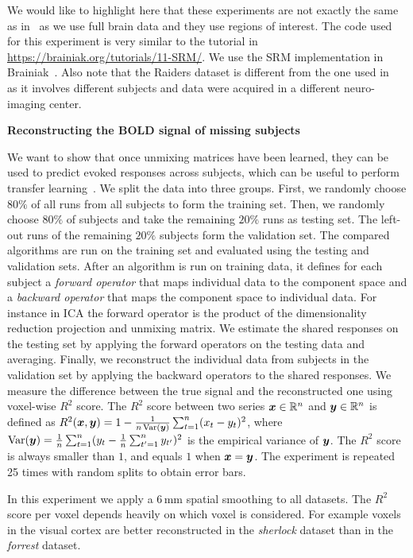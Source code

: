 We would like to highlight here that these experiments are not exactly the same as in~\cite{chen2015reduced} as we use full brain data and they use regions of interest. The code used for this experiment is very similar to the tutorial in \url{https://brainiak.org/tutorials/11-SRM/}. We use the SRM implementation in Brainiak~\cite{kumar2020brainiak}. Also note that the Raiders dataset is different from the one used in~\cite{chen2015reduced} as it involves different subjects and data were acquired in a different neuro-imaging center.

\textbf{Reconstructing the BOLD signal of missing subjects}
\label{sec:srm:reconstruction}

We want to show that once unmixing matrices have been learned, they can be
used to predict
evoked responses across subjects, which can be useful to perform transfer learning~\cite{zhang2018transfer}.
%
We split the data into three groups. First, we randomly choose $80\%$ of all runs from all subjects to form the training set.
%
Then, we randomly choose $80\%$ of subjects and take the remaining $20\%$  runs as testing set.
%
The left-out runs  of the remaining $20\%$ subjects form the validation set.
%
The compared algorithms are run on the training set and evaluated using the testing and validation sets.
%
After an algorithm is run on training data, it defines for each subject a \emph{forward operator} that maps individual data to the component space and a \emph{backward operator} that maps the component space to individual data. For instance in ICA the forward operator is the product of the dimensionality reduction projection and unmixing matrix.
%
We estimate the shared responses on the testing set by applying the forward operators on the testing data and averaging. Finally, we reconstruct the individual data from subjects in the validation set by applying the backward operators to the shared responses. We measure the difference between the true signal and the reconstructed one using voxel-wise $R^2$ score. The $R^2$ score between two series $\boldsymbol{x} \in \mathbb{R}^n$ and $\boldsymbol{y} \in \mathbb{R}^n$ is defined as
$R^2(\boldsymbol{x}, \boldsymbol{y}) = 1 - \frac1{n\operatorname*{Var}(\boldsymbol{y})}\sum_{t=1}^n (x_t - y_t)^2$, where $\operatorname*{Var}(\boldsymbol{y}) = \frac1n\sum_{t=1}^n (y_t - \frac1n \sum_{t'=1}^n y_{t'})^2$ is the empirical variance of $\boldsymbol{y}$.
%
The $R^2$ score is always smaller than $1$, and equals $1$ when $\boldsymbol{x}= \boldsymbol{y}$.
The experiment is repeated 25 times with random splits to obtain error bars.


In this experiment we apply a 6\,mm spatial smoothing to all datasets. The $R^2$ score per
voxel depends heavily on which voxel is considered. For example voxels in the
visual cortex are better reconstructed in the \emph{sherlock} dataset than in
the \emph{forrest} dataset.

